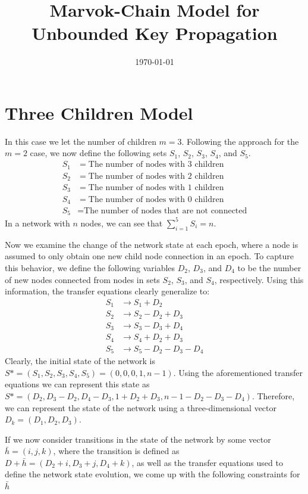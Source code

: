 \documentclass[a4paper,10pt]{article}
\title{Marvok-Chain Model for Unbounded Key Propagation}
\author{}
\date{\today}
\begin{document}
\maketitle

\section{Three Children Model}
In this case we let the number of children $m = 3$. Following the approach for the 
$m = 2$ case, we now define the following sets $S_1$, $S_2$, $S_3$, $S_4$, and $S_5$.
\begin{align*}
S_1 & = \text{The number of nodes with $3$ children} \\
S_2 & = \text{The number of nodes with $2$ children} \\
S_3 & = \text{The number of nodes with $1$ children} \\
S_4 & = \text{The number of nodes with $0$ children} \\
S_5 & = \text{The number of nodes that are not connected}
\end{align*}
In a network with $n$ nodes, we can see that $\sum_{i = 1}^{5}S_i = n$. 

Now we examine the change of the network state at each epoch, where a node is
assumed to only obtain one new child node connection in an epoch. To capture this
behavior, we define the following variables $D_2$, $D_3$, and $D_4$ to be the
number of new nodes connected from nodes in sets $S_2$, $S_3$, and $S_4$, respectively. 
Using this information, the transfer equations clearly generalize to:
\begin{align*}
S_1 & \rightarrow S_1 + D_2 \\
S_2 & \rightarrow S_2 - D_2 + D_3 \\
S_3 & \rightarrow S_3 - D_3 + D_4 \\
S_4 & \rightarrow S_4 + D_2 + D_3 \\
S_5 & \rightarrow S_5 - D_2 - D_3 - D_4
\end{align*}
Clearly, the initial state of the network is $S* = (S_1, S_2, S_3, S_4, S_5) = (0, 0, 0, 1, n - 1)$.
Using the aforementioned transfer equations we can represent this state as 
$S* = (D_2, D_3 - D_2, D_4 - D_3, 1 + D_2 + D_3, n - 1 - D_2 - D_3 - D_4)$. 
Therefore, we can represent the state of the network using a three-dimensional vector
$D_k = (D_1, D_2, D_3)$. 

If we now consider transitions in the state of the network by some vector $\bar{h} = (i, j, k)$, where the 
transition is defined as $D + \bar{h} = (D_2 + i, D_3 + j, D_4 + k)$, as well as the transfer equations
used to define the network state evolution, we come up with the following constraints for $\bar{h}$
\end{document}
